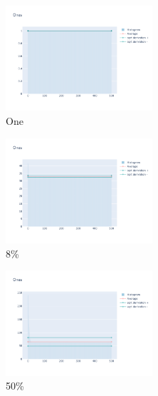 \documentclass[12pt, fleqn]{report}                             %
\theoremstyle{break}                                            %
\begin{document}
      \begin{figure}[ht!]
        \centering
        \begin{subfigure}[b]{0.4\linewidth}
          \includegraphics[width=0.6\textwidth]{Images/172/dia-a.png}
          \caption{One}
        \end{subfigure}
        \begin{subfigure}[b]{0.4\linewidth}
          \includegraphics[width=0.6\textwidth]{Images/172/dia-b.png}
          \caption{8\%}
        \end{subfigure}
        \begin{subfigure}[b]{0.4\linewidth}
          \includegraphics[width=0.6\textwidth]{Images/172/dia-c.png}
          \caption{50\%}
        \end{subfigure}
        \begin{subfigure}[b]{0.4\linewidth}

\end{subfigure}
\end{figure}
\end{document}
